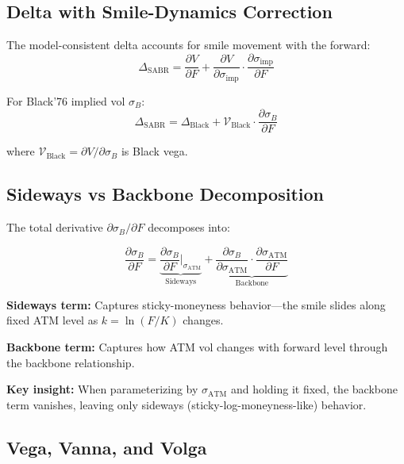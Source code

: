 \documentclass[12pt,a4paper]{report}
\begin{document}
\subsection{Delta with Smile-Dynamics Correction}

The model-consistent delta accounts for smile movement with the forward:
\begin{equation}
    \Delta_{\text{SABR}} = \frac{\partial V}{\partial F} + \frac{\partial V}{\partial \sigma_{\text{imp}}} \cdot \frac{\partial \sigma_{\text{imp}}}{\partial F}
\end{equation}

For Black'76 implied vol $\sigma_B$:
\begin{equation}
    \Delta_{\text{SABR}} = \Delta_{\text{Black}} + \mathcal{V}_{\text{Black}} \cdot \frac{\partial \sigma_B}{\partial F}
\end{equation}

where $\mathcal{V}_{\text{Black}} = \partial V / \partial \sigma_B$ is Black vega.

\subsection{Sideways vs Backbone Decomposition}

The total derivative $\partial \sigma_B / \partial F$ decomposes into:

\begin{equation}
    \frac{\partial \sigma_B}{\partial F} = \underbrace{\frac{\partial \sigma_B}{\partial F}\bigg|_{\sigma_{\text{ATM}}}}_\text{Sideways} + \underbrace{\frac{\partial \sigma_B}{\partial \sigma_{\text{ATM}}} \cdot \frac{\partial \sigma_{\text{ATM}}}{\partial F}}_\text{Backbone}
\end{equation}

\textbf{Sideways term:} Captures sticky-moneyness behavior---the smile slides along fixed ATM level as $k = \ln(F/K)$ changes.

\textbf{Backbone term:} Captures how ATM vol changes with forward level through the backbone relationship.

\textbf{Key insight:} When parameterizing by $\sigma_{\text{ATM}}$ and holding it fixed, the backbone term vanishes, leaving only sideways (sticky-log-moneyness-like) behavior.

\subsection{Vega, Vanna, and Volga}
\end{document}
